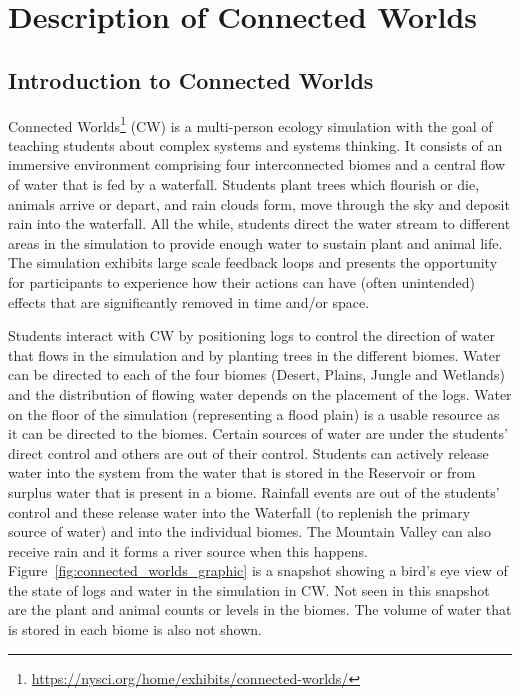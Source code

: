\section{Description of Connected Worlds}\label{sec:connected_worlds}

\subsection{Introduction to Connected Worlds}\label{sec:connected_worlds_intro}
Connected Worlds\footnote{\url{https://nysci.org/home/exhibits/connected-worlds/}} (CW) is a multi-person ecology simulation with the goal of teaching students about complex systems and systems thinking.  It consists of an immersive environment comprising four interconnected biomes and a central flow of water that is fed by a waterfall. Students plant trees which flourish or die, animals arrive or depart, and rain clouds form, move through the sky and deposit rain into the waterfall. All the while, students direct the water stream to different areas in the simulation to provide enough water to sustain plant and animal life. The simulation exhibits large scale feedback loops and presents the opportunity for participants to experience how their actions can have (often unintended) effects that are significantly removed in time and/or space.

Students interact with CW by positioning logs to control the direction of water that flows in the simulation and by planting trees in the different biomes. Water can be directed to each of the four biomes (Desert, Plains, Jungle and Wetlands) and the distribution of flowing water depends on the placement of the logs. Water on the floor of the simulation (representing a flood plain) is a usable resource as it can be directed to the biomes. Certain sources of water are under the students' direct control and others are out of their control. Students can actively release water into the system from the water that is stored in the Reservoir or from surplus water that is present in a biome. Rainfall events are out of the students' control and these release water into the Waterfall (to replenish the primary source of water) and into the individual biomes. The Mountain Valley can also receive rain and it forms a river source when this happens. Figure~\ref{fig:connected_worlds_graphic} is a snapshot showing a bird's eye view of the state of logs and water in the simulation in CW. Not seen in this snapshot are the plant and animal counts or levels in the biomes. The volume of water that is stored in each biome is also not shown.

